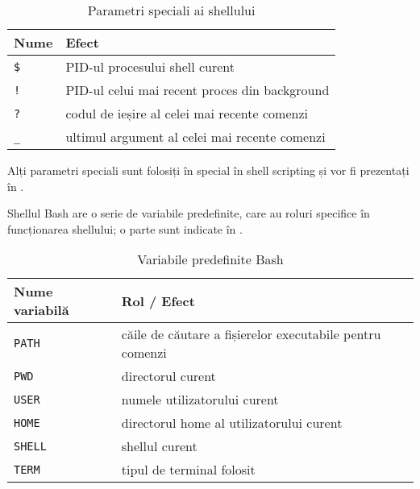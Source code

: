 \begin{table}[!htb]
  \caption{Parametri speciali ai shellului}
  \begin{center}
    \begin{tabular}{ p{} p{} }
      \toprule
        \textbf{Nume} &
        \textbf{Efect} \\
      \midrule
        \texttt{\$} &
        PID-ul procesului shell curent \\
      \midrule
        \texttt{!} &
        PID-ul celui mai recent proces din background \\
      \midrule
        \texttt{?} &
        codul de ieșire al celei mai recente comenzi \\
      \midrule
        \texttt{\_} &
        ultimul argument al celei mai recente comenzi \\
      \bottomrule
    \end{tabular}
    \label{tab:cli:special-shell-vars}
  \end{center}
\end{table}

Alți parametri speciali sunt folosiți în special în shell scripting și vor fi
prezentați în .

Shellul Bash are o serie de variabile predefinite, care au roluri specifice în
funcționarea shellului; o parte sunt indicate în .

\begin{table}[!htb]
  \caption{Variabile predefinite Bash}
  \begin{center}
    \begin{tabular}{ p{} p{} }
      \toprule
        \textbf{Nume variabilă} &
        \textbf{Rol / Efect} \\
      \midrule
        \texttt{PATH} &
        căile de căutare a fișierelor executabile pentru comenzi \\
      \midrule
        \texttt{PWD} &
        directorul curent \\
      \midrule
        \texttt{USER} &
        numele utilizatorului curent \\
      \midrule
        \texttt{HOME} &
        directorul home al utilizatorului curent \\
      \midrule
        \texttt{SHELL} &
        shellul curent \\
      \midrule
        \texttt{TERM} &
        tipul de terminal folosit \\
      \bottomrule
    \end{tabular}
    \label{tab:cli:shell-vars}
  \end{center}
\end{table}

